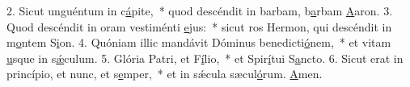 2. Sicut unguéntum in c\uline{á}pite,~* quod descéndit in barbam, b\uline{a}rbam \uline{A}aron.
3. Quod descéndit in oram vestiménti \uline{e}jus:~* sicut ros Hermon, qui descéndit in m\uline{o}ntem S\uline{i}on.
4. Quóniam illic mandávit Dóminus benedicti\uline{ó}nem,~* et vitam \uline{u}sque in s\uline{ǽ}culum.
5. Glória Patri, et F\uline{í}lio,~* et Spir\uline{í}tui S\uline{a}ncto.
6. Sicut erat in princípio, et nunc, et s\uline{e}mper,~* et in sǽcula sæcul\uline{ó}rum. \uline{A}men.
